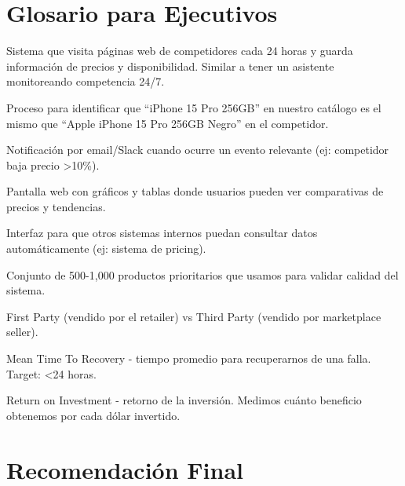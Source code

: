 \documentclass[12pt,a4paper]{article}
\begin{document}
\newpage
\section{Glosario para Ejecutivos}

\begin{description}[leftmargin=4cm, style=nextline]
    \item[Captura automática de precios] Sistema que visita páginas web de competidores cada 24 horas y guarda información de precios y disponibilidad. Similar a tener un asistente monitoreando competencia 24/7.

    \item[Matching de productos] Proceso para identificar que ``iPhone 15 Pro 256GB'' en nuestro catálogo es el mismo que ``Apple iPhone 15 Pro 256GB Negro'' en el competidor.

    \item[Alerta automática] Notificación por email/Slack cuando ocurre un evento relevante (ej: competidor baja precio >10\%).

    \item[Dashboard] Pantalla web con gráficos y tablas donde usuarios pueden ver comparativas de precios y tendencias.

    \item[API] Interfaz para que otros sistemas internos puedan consultar datos automáticamente (ej: sistema de pricing).

    \item[Golden set] Conjunto de 500-1,000 productos prioritarios que usamos para validar calidad del sistema.

    \item[1P / 3P] First Party (vendido por el retailer) vs Third Party (vendido por marketplace seller).

    \item[MTTR] Mean Time To Recovery - tiempo promedio para recuperarnos de una falla. Target: <24 horas.

    \item[ROI] Return on Investment - retorno de la inversión. Medimos cuánto beneficio obtenemos por cada dólar invertido.
\end{description}

\newpage
\section*{Recomendación Final}
\end{document}
